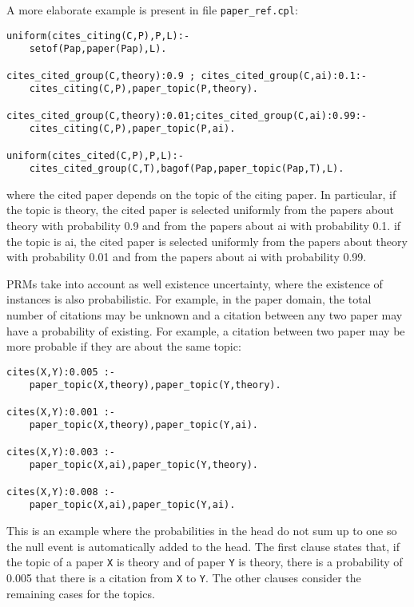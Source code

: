 \documentclass[a4paper,10pt]{article}
\begin{document}
A more elaborate example is present in file \verb|paper_ref.cpl|:
\begin{verbatim}
uniform(cites_citing(C,P),P,L):-
    setof(Pap,paper(Pap),L).

cites_cited_group(C,theory):0.9 ; cites_cited_group(C,ai):0.1:-
    cites_citing(C,P),paper_topic(P,theory).

cites_cited_group(C,theory):0.01;cites_cited_group(C,ai):0.99:-
    cites_citing(C,P),paper_topic(P,ai).

uniform(cites_cited(C,P),P,L):-
    cites_cited_group(C,T),bagof(Pap,paper_topic(Pap,T),L).
\end{verbatim}
where the cited paper depends on the topic of the citing paper. In particular, if the topic is theory, the cited paper is selected uniformly  from the papers about theory with probability 0.9 and from the papers about ai with probability 0.1. if the topic is ai, the cited paper is selected uniformly  from the papers about theory with probability 0.01 and from the papers about ai with probability 0.99.

PRMs take into account as well existence uncertainty, where the existence of instances is also probabilistic. For example, in the paper domain, the total number of citations may be unknown and  a citation between any two paper may have a probability of existing. For example, a citation between two paper may be more probable if they are about the same topic:
\begin{verbatim}
cites(X,Y):0.005 :- 
    paper_topic(X,theory),paper_topic(Y,theory).

cites(X,Y):0.001 :- 
    paper_topic(X,theory),paper_topic(Y,ai).

cites(X,Y):0.003 :- 
    paper_topic(X,ai),paper_topic(Y,theory).

cites(X,Y):0.008 :- 
    paper_topic(X,ai),paper_topic(Y,ai).
\end{verbatim}
This is an example where the probabilities in the head do not sum up to one so the null event is automatically added to the head.
The first clause states that, if the topic of a paper \texttt{X} is theory and  of  paper \texttt{Y} is theory, there is a probability of 0.005 that there is a citation from \texttt{X} to \texttt{Y}. The other clauses consider the remaining cases for the topics.
\end{document}
